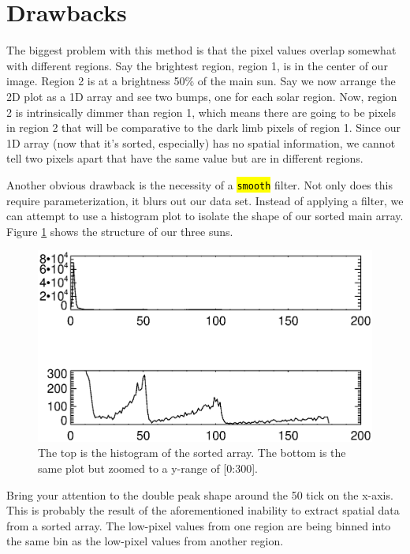 \documentclass[10pt]{scrartcl}
\begin{document}


\section{Drawbacks} %
\label{sec:drawbacks}
    
    The biggest problem with this method is that the pixel values overlap somewhat with different regions. Say the brightest region, region 1, is in the center of our image. Region 2 is at a brightness 50\% of the main sun. Say we now arrange the 2D plot as a 1D array and see two bumps, one for each solar region. Now, region 2 is intrinsically dimmer than region 1, which means there are going to be pixels in region 2 that will be comparative to the dark limb pixels of region 1. Since our 1D array (now that it's sorted, especially) has no spatial information, we cannot tell two pixels apart that have the same value but are in different regions. 

    Another obvious drawback is the necessity of a \hl{\texttt{smooth}} filter. Not only does this require parameterization, it blurs out our data set. Instead of applying a filter, we can attempt to use a histogram plot to isolate the shape of our sorted main array. Figure \ref{histozoom} shows the structure of our three suns.

\begin{figure}[!ht]
    \centering
    \includegraphics[width=.9\textwidth]{../plots_tables_images/histozoom.eps}
    \caption{The top is the histogram of the sorted array. The bottom is the same plot but zoomed to a y-range of [0:300].}
    \label{histozoom}
\end{figure}

    Bring your attention to the double peak shape around the 50 tick on the x-axis. This is probably the result of the aforementioned inability to extract spatial data from a sorted array. The low-pixel values from one region are being binned into the same bin as the low-pixel values from another region. 
\end{document}
